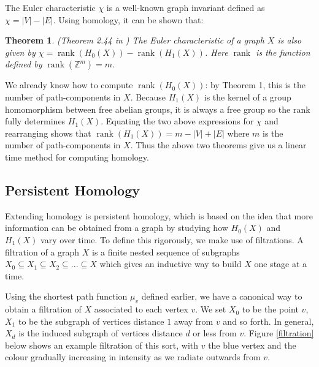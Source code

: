 \documentclass[12pt,a4paper]{amsart}
\numberwithin{equation}{section}
\def\Z{{\mathbb Z}}
\def\rank{\operatorname{rank}}
\theoremstyle{plain}
\newtheorem{Th}{Theorem}
\theoremstyle{definition}
\begin{document}
The Euler characteristic $\chi$ is a well-known graph invariant defined as $\chi = |V| - |E|$. Using homology, it can be shown that:

\begin{Th}
(Theorem 2.44 in \cite{hatcher})
The Euler characteristic of a graph $X$ is also given by $\chi = \rank(H_0(X)) - \rank(H_1(X))$. Here $\rank$ is the function defined by $\rank(\Z^m) = m$.
\end{Th}

We already know how to compute $\rank(H_0(X))$: by Theorem 1, this is the number of path-components in $X$. Because $H_1(X)$ is the kernel of a group homomorphism between free abelian groups, it is always a free group so the rank fully determines $H_1(X)$. Equating the two above expressions for $\chi$ and rearranging shows that $\rank(H_1(X)) = m - |V| + |E|$ where $m$ is the number of path-components in $X$. Thus the above two theorems give us a linear time method for computing homology.

\subsection*{Persistent Homology}

Extending homology is persistent homology, which is based on the idea that more information can be obtained from a graph by studying how $H_0(X)$ and $H_1(X)$ vary over time. To define this rigorously, we make use of filtrations. A filtration of a graph $X$ is a finite nested sequence of subgraphs $X_0 \subseteq X_1 \subseteq X_2 \subseteq ... \subseteq X$ which gives an inductive way to build $X$ one stage at a time.

Using the shortest path function $\mu_v$ defined earlier, we have a canonical way to obtain a filtration of $X$ associated to each vertex $v$. We set $X_0$ to be the point $v$, $X_1$ to be the subgraph of vertices distance $1$ away from $v$ and so forth. In general, $X_d$ is the induced subgraph of vertices distance $d$ or less from $v$. Figure \ref{filtration} below shows an example filtration of this sort, with $v$ the blue vertex and the colour gradually increasing in intensity as we radiate outwards from $v$.
\end{document}
